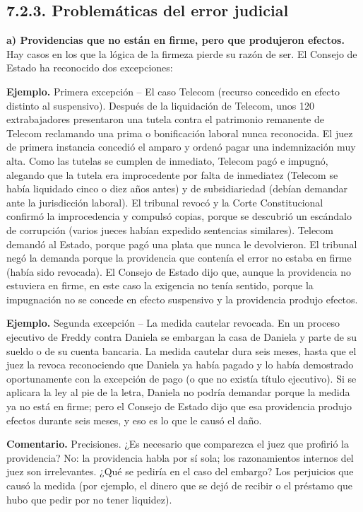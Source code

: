 \subsection{7.2.3. Problemáticas del error judicial}
\textbf{a) Providencias que no están en firme, pero que produjeron efectos.} Hay casos en los que la lógica de la firmeza pierde su razón de ser. El Consejo de Estado ha reconocido dos excepciones:

\begin{ejemplo}
\textcolor[HTML]{4F6228}{\textbf{Ejemplo. }}Primera excepción – El caso Telecom (recurso concedido en efecto distinto al suspensivo). Después de la liquidación de Telecom, unos 120 extrabajadores presentaron una tutela contra el patrimonio remanente de Telecom reclamando una prima o bonificación laboral nunca reconocida. El juez de primera instancia concedió el amparo y ordenó pagar una indemnización muy alta. Como las tutelas se cumplen de inmediato, Telecom pagó e impugnó, alegando que la tutela era improcedente por falta de inmediatez (Telecom se había liquidado cinco o diez años antes) y de subsidiariedad (debían demandar ante la jurisdicción laboral). El tribunal revocó y la Corte Constitucional confirmó la improcedencia y compulsó copias, porque se descubrió un escándalo de corrupción (varios jueces habían expedido sentencias similares). Telecom demandó al Estado, porque pagó una plata que nunca le devolvieron. El tribunal negó la demanda porque la providencia que contenía el error no estaba en firme (había sido revocada). El Consejo de Estado dijo que, aunque la providencia no estuviera en firme, en este caso la exigencia no tenía sentido, porque la impugnación no se concede en efecto suspensivo y la providencia produjo efectos.
\par
\textcolor[HTML]{4F6228}{\textbf{Ejemplo. }}Segunda excepción – La medida cautelar revocada. En un proceso ejecutivo de Freddy contra Daniela se embargan la casa de Daniela y parte de su sueldo o de su cuenta bancaria. La medida cautelar dura seis meses, hasta que el juez la revoca reconociendo que Daniela ya había pagado y lo había demostrado oportunamente con la excepción de pago (o que no existía título ejecutivo). Si se aplicara la ley al pie de la letra, Daniela no podría demandar porque la medida ya no está en firme; pero el Consejo de Estado dijo que esa providencia produjo efectos durante seis meses, y eso es lo que le causó el daño.
\end{ejemplo}
\begin{comentario}
\textcolor[HTML]{8A6D3B}{\textbf{Comentario. }}Precisiones. ¿Es necesario que comparezca el juez que profirió la providencia? No: la providencia habla por sí sola; los razonamientos internos del juez son irrelevantes. ¿Qué se pediría en el caso del embargo? Los perjuicios que causó la medida (por ejemplo, el dinero que se dejó de recibir o el préstamo que hubo que pedir por no tener liquidez).
\end{comentario}
